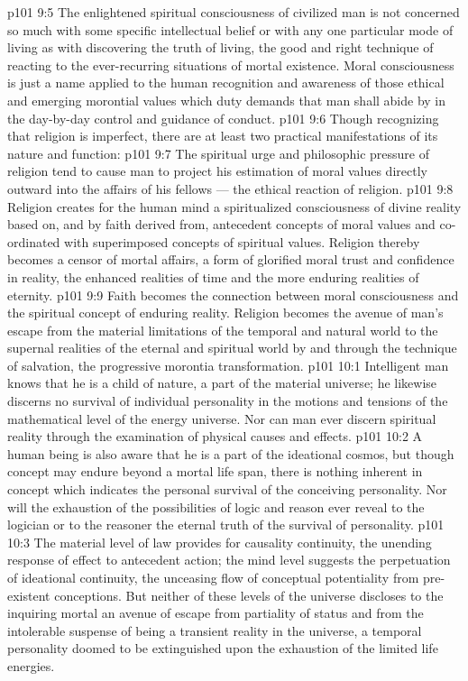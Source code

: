 \vs p101 9:5 The enlightened spiritual consciousness of civilized man is not concerned so much with some specific intellectual belief or with any one particular mode of living as with discovering the truth of living, the good and right technique of reacting to the ever\hyp{}recurring situations of mortal existence. Moral consciousness is just a name applied to the human recognition and awareness of those ethical and emerging morontial values which duty demands that man shall abide by in the day\hyp{}by\hyp{}day control and guidance of conduct.
\vs p101 9:6 \pc Though recognizing that religion is imperfect, there are at least two practical manifestations of its nature and function:
\vs p101 9:7 \bibnobreakspace The spiritual urge and philosophic pressure of religion tend to cause man to project his estimation of moral values directly outward into the affairs of his fellows --- the ethical reaction of religion.
\vs p101 9:8 \pc {}\bibnobreakspace Religion creates for the human mind a spiritualized consciousness of divine reality based on, and by faith derived from, antecedent concepts of moral values and co\hyp{}ordinated with superimposed concepts of spiritual values. Religion thereby becomes a censor of mortal affairs, a form of glorified moral trust and confidence in reality, the enhanced realities of time and the more enduring realities of eternity.
\vs p101 9:9 \pc Faith becomes the connection between moral consciousness and the spiritual concept of enduring reality. Religion becomes the avenue of man’s escape from the material limitations of the temporal and natural world to the supernal realities of the eternal and spiritual world by and through the technique of salvation, the progressive morontia transformation.
\vs p101 10:1 Intelligent man knows that he is a child of nature, a part of the material universe; he likewise discerns no survival of individual personality in the motions and tensions of the mathematical level of the energy universe. Nor can man ever discern spiritual reality through the examination of physical causes and effects.
\vs p101 10:2 A human being is also aware that he is a part of the ideational cosmos, but though concept may endure beyond a mortal life span, there is nothing inherent in concept which indicates the personal survival of the conceiving personality. Nor will the exhaustion of the possibilities of logic and reason ever reveal to the logician or to the reasoner the eternal truth of the survival of personality.
\vs p101 10:3 The material level of law provides for causality continuity, the unending response of effect to antecedent action; the mind level suggests the perpetuation of ideational continuity, the unceasing flow of conceptual potentiality from pre\hyp{}existent conceptions. But neither of these levels of the universe discloses to the inquiring mortal an avenue of escape from partiality of status and from the intolerable suspense of being a transient reality in the universe, a temporal personality doomed to be extinguished upon the exhaustion of the limited life energies.
